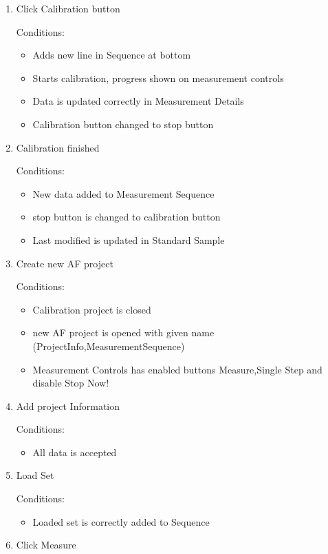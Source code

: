 \begin{enumerate}
\item Click Calibration button

Conditions:
\begin{itemize}
\item Adds new line in Sequence at bottom
\item Starts calibration, progress shown on measurement controls
\item Data is updated correctly in Measurement Details
\item Calibration button changed to stop button
\end{itemize}

\item Calibration finished

Conditions:
\begin{itemize}
\item New data added to Measurement Sequence
\item stop button is changed to calibration button
\item Last modified is updated in Standard Sample
\end{itemize}

\item Create new AF project

Conditions:
\begin{itemize}
\item Calibration project is closed
\item new AF project is opened with given name (ProjectInfo,MeasurementSequence)
\item Measurement Controls has enabled buttons Measure,Single Step and disable Stop Now!
\end{itemize}

\item Add project Information

Conditions:
\begin{itemize}
\item All data is accepted
\end{itemize}

\item Load Set

Conditions:
\begin{itemize}
\item Loaded set is correctly added to Sequence
\end{itemize}

\item Click Measure


\end{enumerate}

